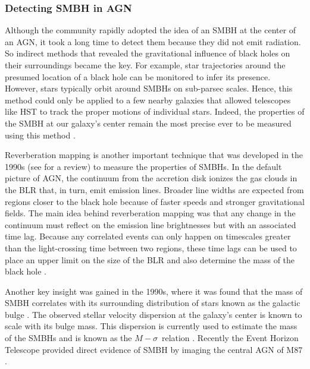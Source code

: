 \subsubsection{Detecting SMBH in AGN}
Although the community rapidly adopted the idea of an SMBH at the center of an AGN, it took a long time to detect them because they did not emit radiation. So indirect methods that revealed the gravitational influence of black holes on their surroundings became the key. For example, star trajectories around the presumed location of a black hole can be monitored to infer its presence. However, stars typically orbit around SMBHs on sub-parsec scales. Hence, this method could only be applied to a few nearby galaxies that allowed telescopes like HST to track the proper motions of individual stars. Indeed, the properties of the SMBH at our galaxy's center remain the most precise ever to be measured using this method \citep{2008ApJ...689.1044G}.

Reverberation mapping is another important technique that was developed in the 1990s (see \citet{Peterson2004} for a review) to measure the properties of SMBHs. In the default picture of AGN, the continuum from the accretion disk ionizes the gas clouds in the BLR that, in turn, emit emission lines. Broader line widths are expected from regions closer to the black hole because of faster speeds and stronger gravitational fields. The main idea behind reverberation mapping was that any change in the continuum must reflect on the emission line brightnesses but with an associated time lag. Because any correlated events can only happen on timescales greater than the light-crossing time between two regions, these time lags can be used to place an upper limit on the size of the BLR and also determine the mass of the black hole \citep{Peterson2004}. 

Another key insight was gained in the 1990s, where it was found that the mass of SMBH correlates with its surrounding distribution of stars known as the galactic bulge \citep{magorrian1998demography}. The observed stellar velocity dispersion at the galaxy's center is known to scale with its bulge mass. This dispersion is currently used to estimate the mass of the SMBHs and is known as the $M-\sigma$~relation
\citep{ferrarese2000fundamental,gebhardt2000relationship}. Recently the Event Horizon Telescope provided direct evidence of SMBH by imaging the central AGN of M87 \citep{2019ApJ...875L...1E}.
